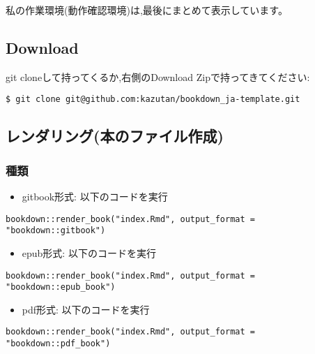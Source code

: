 \documentclass[
]{book}
\providecommand{\tightlist}{%
  \setlength{\itemsep}{0pt}\setlength{\parskip}{0pt}}
\begin{document}
私の作業環境(動作確認環境)は,最後にまとめて表示しています。

\subsection{Download}\label{download}

git cloneして持ってくるか,右側のDownload Zipで持ってきてください:

\begin{verbatim}
$ git clone git@github.com:kazutan/bookdown_ja-template.git
\end{verbatim}

\subsection{レンダリング(本のファイル作成)}\label{ux30ecux30f3ux30c0ux30eaux30f3ux30b0ux672cux306eux30d5ux30a1ux30a4ux30ebux4f5cux6210}

\subsubsection{種類}\label{ux7a2eux985e}

\begin{itemize}
\tightlist
\item
  gitbook形式: 以下のコードを実行
\end{itemize}

\begin{verbatim}
bookdown::render_book("index.Rmd", output_format = "bookdown::gitbook")
\end{verbatim}

\begin{itemize}
\tightlist
\item
  epub形式: 以下のコードを実行
\end{itemize}

\begin{verbatim}
bookdown::render_book("index.Rmd", output_format = "bookdown::epub_book")
\end{verbatim}

\begin{itemize}
\tightlist
\item
  pdf形式: 以下のコードを実行
\end{itemize}

\begin{verbatim}
bookdown::render_book("index.Rmd", output_format = "bookdown::pdf_book")
\end{verbatim}
\end{document}
